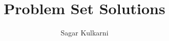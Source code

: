 \begin{titlepage}
    \title{Problem Set Solutions}
    \author{Sagar Kulkarni}
    

\end{titlepage}
